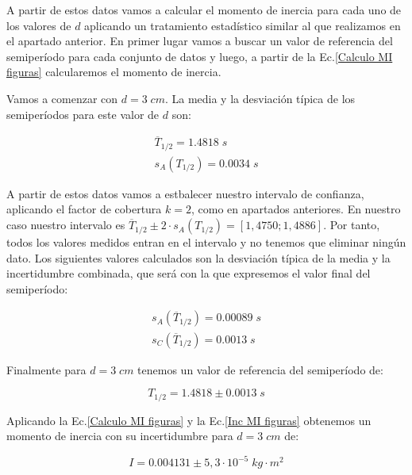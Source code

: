 \documentclass[a4paper,12pt,titlepage]{article}
\begin{document}
A partir de estos datos vamos a calcular el momento de inercia para cada uno de los valores de $d$ aplicando un tratamiento estadístico similar al que realizamos en el apartado anterior. En primer lugar vamos a buscar un valor de referencia del semiperíodo para cada conjunto de datos y luego, a partir de la Ec.\ref{Calculo MI figuras} calcularemos el momento de inercia.

\par Vamos a comenzar con $d=3\; cm$. La media y la desviación típica de los semiperíodos para este valor de $d$ son:

\begin{equation}
    \begin{gathered}
        \overline{T}_{1/2} = 1.4818\; s \\
        s_A(T_{1/2}) =  0.0034 \; s
    \end{gathered}
\end{equation}

A partir de estos datos vamos a estbalecer nuestro intervalo de confianza, aplicando el factor de cobertura $k=2$, como en apartados anteriores. En nuestro caso nuestro intervalo es $\overline{T}_{1/2} \pm 2\cdot s_A(T_{1/2}) = [1,4750;1,4886]$. Por tanto, todos los valores medidos entran en el intervalo y no tenemos que eliminar ningún dato. Los siguientes valores calculados son la desviación típica de la media y la incertidumbre combinada, que será con la que expresemos el valor final del semiperíodo:

\begin{equation}
    \begin{gathered}
        s_A(\overline{T}_{1/2}) = 0.00089\; s\\
        s_C(\overline{T}_{1/2}) = 0.0013\; s
    \end{gathered}
\end{equation}

Finalmente para $d=3 \; cm$ tenemos un valor de referencia del semiperíodo de:

\begin{equation}
    T_{1/2} = 1.4818 \pm 0.0013\; s
\end{equation}

Aplicando la Ec.\ref{Calculo MI figuras} y la Ec.\ref{Inc MI figuras} obtenemos un momento de inercia con su incertidumbre para $d=3 \; cm$ de:

\begin{equation}
    I = 0.004131 \pm 5,3 \cdot 10^{-5} \; kg\cdot m^2
\end{equation}
\end{document}
